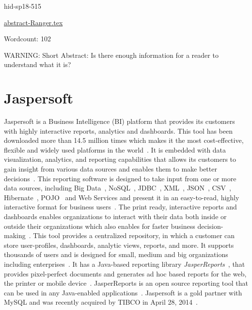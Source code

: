 \begin{IU}

hid-sp18-515

\href{https://github.com/cloudmesh-community/hid-sp18-515/blob/master//technology/abstract-Ranger.tex}{abstract-Ranger.tex}

 

Wordcount: 102

WARNING: Short Abstract: Is there enough information for a reader to understand what it is?

\end{IU}

\section{Jaspersoft}

Jaspersoft is a Business Intelligence (BI) platform that provides its
customers with highly interactive reports, analytics and dashboards. This tool
has been downloaded more than 14.5 million times which makes it the most
cost-effective, flexible and widely used platforms in the 
world~\cite{hid-sp18-516-www-finances-online}. It is embedded with data 
visualization, analytics, and reporting capabilities that allows its
customers to gain insight from various data sources and enables them to make
better decisions~\cite{hid-sp18-516-www-finances-online}. This reporting
software is designed to take input from one or more
data sources, including Big Data~\cite{hid-sp18-516-www-wiki-bigdata}, 
NoSQL~\cite{hid-sp18-516-www-wiki-nosql}, JDBC~\cite{hid-sp18-516-www-wiki-jdbc}, 
XML~\cite{hid-sp18-516-www-wiki-xml}, JSON~\cite{hid-sp18-516-www-wiki-json}, 
CSV~\cite{hid-sp18-516-www-wiki-csv}, 
Hibernate~\cite{hid-sp18-516-www-wiki-hibernate}, 
POJO~\cite{hid-sp18-516-www-wiki-pojo} and Web Services and present it in an 
easy-to-read, highly interactive format for business 
users~\cite{hid-sp18-516-www-jaspersoft-overview}. The print ready, interactive 
reports and dashboards enables organizations to interact with their data both 
inside or outside their organizations which also enables for faster business 
decision-making~\cite{hid-sp18-516-www-jaspersoft-overview}. This tool
provides a centralized repository, in which a customer can store user-profiles,
dashboards, analytic views, reports, and more. It supports thousands of users
and is designed for small, medium and big organizations including
enterprises~\cite{hid-sp18-516-www-finances-online}. It has a Java-based
reporting library
\textit{JasperReports}~\cite{hid-sp18-516-www-finances-online}, that provides
pixel-perfect documents and generates ad hoc based reports for the web, the
printer or mobile device~\cite{hid-sp18-516-www-jaspersoft-overview}.
JasperReports is an open source reporting tool that can be
used in any Java-enabled
applications~\cite{hid-sp18-516-www-wiki-jasperreports}. Jaspersoft is a gold
partner with MySQL and was recently acquired by TIBCO in April 28,
2014~\cite{hid-sp18-516-www-wiki-jasperreports}.


